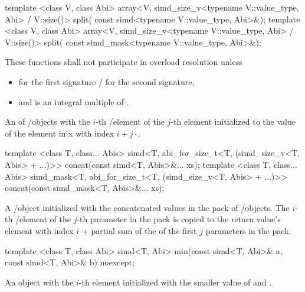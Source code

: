\begin{itemdecl}
template <class V, class Abi>
array<V, simd_size_v<typename V::value_type, Abi> / V::size()> split(
    const simd<typename V::value_type, Abi>&);
template <class V, class Abi>
array<V, simd_size_v<typename V::value_type, Abi> / V::size()> split(
    const simd_mask<typename V::value_type, Abi>&);
\end{itemdecl}
\begin{itemdescr}
  \pnum\remarks These functions shall not participate in overload resolution unless
  \begin{itemize}
    \item {} for the first signature /  for the second signature,
    \item and  is an integral multiple of .
  \end{itemize}

  \pnum\returns An  of \simd/\mask objects with the $i$-th \simd/\mask element of the $j$-th  element initialized to the value of the element in \code x with index $i + j \cdot $.
\end{itemdescr}

\begin{itemdecl}
template <class T, class... Abis>
simd<T, abi_for_size_t<T, (simd_size_v<T, Abis> + ...)>> concat(const simd<T, Abis>&... xs);
template <class T, class... Abis>
simd_mask<T, abi_for_size_t<T, (simd_size_v<T, Abis> + ...)>> concat(const simd_mask<T, Abis>&... xs);
\end{itemdecl}
\begin{itemdescr}
  \pnum\returns A \simd/\mask object initialized with the concatenated values in the  pack of \simd/\mask objects.
  The $i$-th \simd/\mask element of the $j$-th parameter in the  pack is copied to the return value's element with index $i$ + partial sum of the  of the first $j$ parameters in the  pack.
\end{itemdescr}

\begin{itemdecl}
template <class T, class Abi> simd<T, Abi> min(const simd<T, Abi>& a, const simd<T, Abi>& b) noexcept;
\end{itemdecl}
\begin{itemdescr}
  \pnum\returns An object with the $i$-th element initialized with the smaller value of  and  \foralli.
\end{itemdescr}

